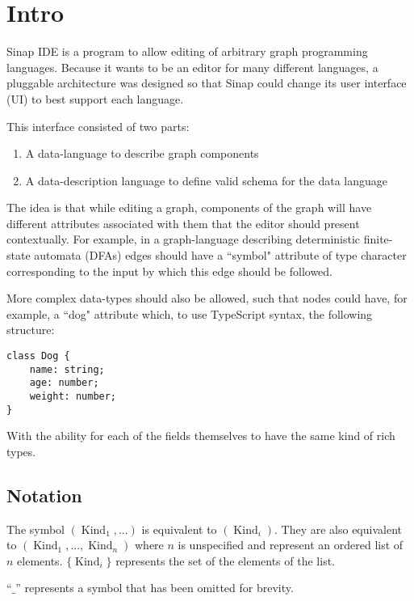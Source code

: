 \documentclass{article}
\begin{document}
\section{Intro}

Sinap IDE is a program to allow editing of arbitrary graph
programming languages. Because it wants to be an editor for 
many different languages, a pluggable architecture was 
designed so that Sinap could change its user interface (UI)
to best support each language. 

This interface consisted of two parts:

\begin{enumerate}
    \item A data-language to describe graph components
    \item A data-description language to define valid schema
    for the data language
\end{enumerate}

The idea is that while editing a graph, components of the
graph will have different attributes associated with them 
that the editor should present contextually. For example, in
a graph-language describing deterministic finite-state 
automata (DFAs) edges should have a ``symbol" attribute of 
type character corresponding to the input by which this 
edge should be followed. 

More complex data-types should also be allowed, such that
nodes could have, for example, a ``dog" attribute which, 
to use TypeScript syntax, the following structure:

\begin{verbatim}
class Dog {
    name: string;
    age: number;
    weight: number;
}
\end{verbatim}

With the ability for each of the fields themselves to have the 
same kind of rich types. 

\subsection{Notation}
The symbol \((\operatorname{Kind}_1, ...)\) is equivalent to 
\((\operatorname{Kind}_i)\). They are also equivalent to 
\((\operatorname{Kind}_1, ..., \operatorname{Kind}_n)\)
where \(n\) is unspecified and represent an ordered list 
of \(n\) elements. \(\{\operatorname{Kind}_i\}\) represents 
the set of the elements of the list. 

``\(\_\)'' represents a symbol that has been omitted for brevity.
\end{document}
